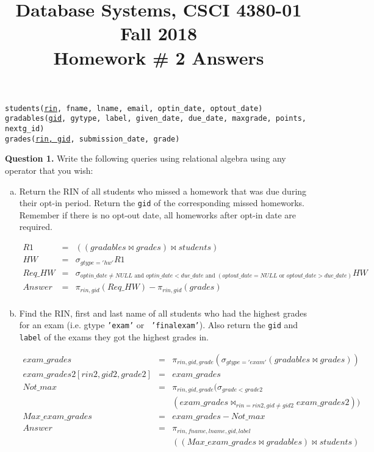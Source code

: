 \documentclass[11pt]{article}
\title{Database Systems, CSCI 4380-01 Fall 2018 \\
Homework \# 2 Answers}
\date{}
\begin{document}
\maketitle

\vspace*{-0.7in}


\hspace*{0.1in} {\tt students(\underline{rin}, fname, lname, email, optin\_date, optout\_date)} \\
\hspace*{0.1in} {\tt gradables(\underline{gid}, gytype, label, given\_date, due\_date, maxgrade, points, nextg\_id)}\\
\hspace*{0.1in} {\tt grades(\underline{rin, gid}, submission\_date, grade)}


{\bf Question 1.} Write the following queries using relational algebra
using any operator that you wish:

\begin{enumerate}[(a)]

\item Return the RIN of all students who missed a homework that was
  due during their opt-in period. Return the {\tt gid} of the
  corresponding missed homeworks. Remember if there is no opt-out
  date, all homeworks after opt-in date are required.

\begin{eqnarray*}
R1 & = & ((gradables \bowtie grades ) \bowtie students)\\
HW & = & \sigma_{gtype='hw'} R1 \\
Req\_HW & = & \sigma_{optin\_date \neq NULL  \mbox { and } optin\_date< due\_date \mbox { and } (optout\_date = NULL \mbox { or }  optout\_date > due\_date)} HW \\
Answer & = & \pi_{rin, gid} (Req\_HW) - \pi_{rin, gid}(grades)\\
\end{eqnarray*}
  
\item Find the RIN, first and last name of all students who had the
  highest grades for an exam (i.e. gtype {\tt 'exam'} or {\tt
    'finalexam'}). Also return the {\tt gid} and {\tt label} of the
  exams they got the highest grades in.

\begin{eqnarray*}
exam\_grades & = & \pi_{rin, gid, grade}(\sigma_{gtype='exam'}(gradables\bowtie grades)) \\
exam\_grades2[rin2, gid2,grade2] & = &exam\_grades \\
Not\_max & = & \pi_{rin, gid, grade}(\sigma_{grade<grade2}\\
&&(exam\_grades \bowtie_{rin=rin2, gid \neq gid2} exam\_grades2)) \\
Max\_exam\_grades & = & exam\_grades - Not\_max \\
Answer &=& \pi_{rin, fname, lname, gid, label}\\
&&((Max\_exam\_grades \bowtie gradables) \bowtie students )
\end{eqnarray*}

\end{enumerate}
\end{document}
